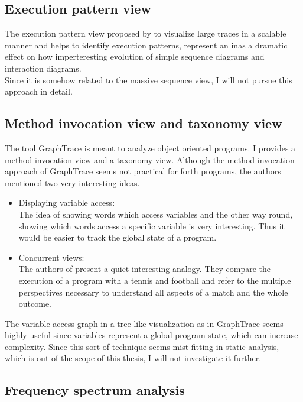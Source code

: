 \subsection*{Execution pattern view}
The execution pattern view proposed by \cite{Pauw98executionpatterns} to visualize large traces in a scalable manner and helps to identify execution patterns, represent an inas a dramatic effect on how imperteresting evolution of simple sequence diagrams and interaction diagrams.
\\
Since it is somehow related to the massive sequence view, I will not pursue this approach in detail.

\subsection*{Method invocation view and taxonomy view}
The tool \gls{GraphTrace}\cite{Kleyn:1988:GOS:62084.62101} is meant to analyze object oriented programs. I provides a method invocation view and a taxonomy view. Although the method invocation approach of GraphTrace seems not practical for forth programs, the authors mentioned two very interesting ideas.
\begin{itemize}
\item Displaying variable access:\\
	The idea of showing words which access variables and the other way round, showing which words access a specific variable is very interesting. Thus it would be easier to track the global state of a program.
\item Concurrent views:\\
	The authors of \cite{Kleyn:1988:GOS:62084.62101} present a quiet interesting analogy. They compare the execution of a program with a tennis and football and refer to the multiple perspectives necessary to understand all aspects of a match and the whole outcome.
\end{itemize}

The variable access graph in a tree like visualization as in GraphTrace seems highly useful since variables represent a global program state, which can increase complexity. Since this sort of technique seems mist fitting in static analysis, which is out of the scope of this thesis, I will not investigate it further.

\subsection*{Frequency spectrum analysis}

